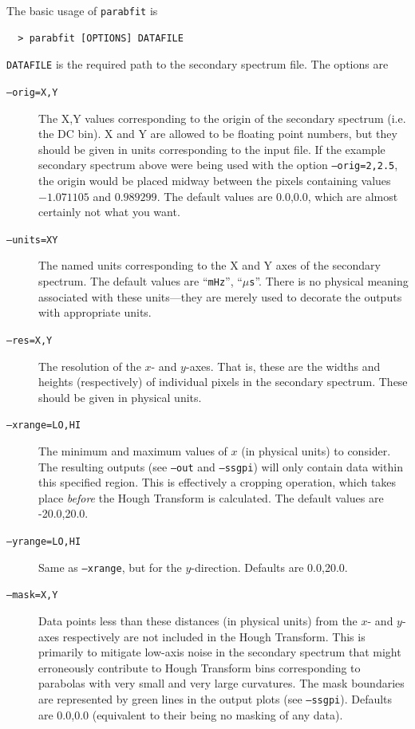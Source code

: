 \documentclass{article}
\newcommand{\parabfit}{\texttt{parabfit}}
\begin{document}
The basic usage of \parabfit{} is
\begin{lstlisting}
  > parabfit [OPTIONS] DATAFILE
\end{lstlisting}
\texttt{DATAFILE} is the required path to the secondary spectrum file.
The options are
\begin{description}
    \item[\texttt{--orig=X,Y}] The X,Y values corresponding to the origin of the secondary spectrum (i.e. the DC bin). X and Y are allowed to be floating point numbers, but they should be given in units corresponding to the input file. If the example secondary spectrum above were being used with the option \texttt{--orig=2,2.5}, the origin would be placed midway between the pixels containing values $-1.071105$ and $0.989299$. The default values are 0.0,0.0, which are almost certainly not what you want.
    \item[\texttt{--units=XY}] The named units corresponding to the X and Y axes of the secondary spectrum. The default values are ``\texttt{mHz}'', ``\texttt{$\mu$s}''. There is no physical meaning associated with these units---they are merely used to decorate the outputs with appropriate units.
    \item[\texttt{--res=X,Y}] The resolution of the $x$- and $y$-axes. That is, these are the widths and heights (respectively) of individual pixels in the secondary spectrum. These should be given in physical units.
    \item[\texttt{--xrange=LO,HI}] The minimum and maximum values of $x$ (in physical units) to consider. The resulting outputs (see \texttt{--out} and \texttt{--ssgpi}) will only contain data within this specified region. This is effectively a cropping operation, which takes place \emph{before} the Hough Transform is calculated. The default values are -20.0,20.0.
    \item[\texttt{--yrange=LO,HI}] Same as \texttt{--xrange}, but for the $y$-direction. Defaults are 0.0,20.0.
    \item[\texttt{--mask=X,Y}] Data points less than these distances (in physical units) from the $x$- and $y$-axes respectively are not included in the Hough Transform. This is primarily to mitigate low-axis noise in the secondary spectrum that might erroneously contribute to Hough Transform bins corresponding to parabolas with very small and very large curvatures. The mask boundaries are represented by green lines in the output plots (see \texttt{--ssgpi}). Defaults are 0.0,0.0 (equivalent to their being no masking of any data).

\end{description}
\end{document}
